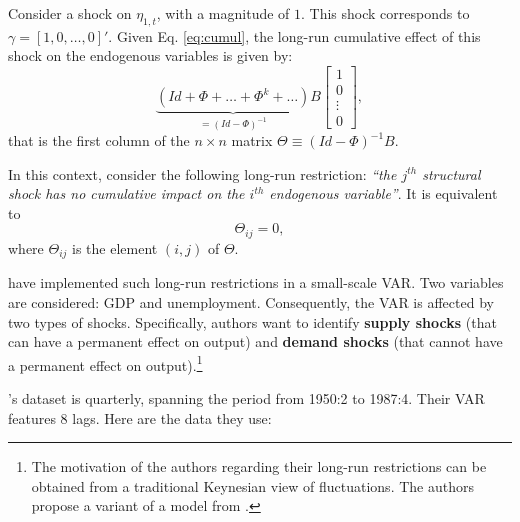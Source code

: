 \documentclass[
  12pt,
]{book}
\newenvironment{Shaded}{\begin{snugshade}}{\end{snugshade}}
\newcommand{\AttributeTok}[1]{\textcolor[rgb]{0.77,0.63,0.00}{#1}}
\newcommand{\DecValTok}[1]{\textcolor[rgb]{0.00,0.00,0.81}{#1}}
\newcommand{\FunctionTok}[1]{\textcolor[rgb]{0.00,0.00,0.00}{#1}}
\newcommand{\NormalTok}[1]{#1}
\newcommand{\SpecialCharTok}[1]{\textcolor[rgb]{0.00,0.00,0.00}{#1}}
\newcommand{\StringTok}[1]{\textcolor[rgb]{0.31,0.60,0.02}{#1}}
\theoremstyle{definition}
\theoremstyle{definition}
\theoremstyle{definition}
\theoremstyle{definition}
\theoremstyle{remark}
\begin{document}
Consider a shock on \(\eta_{1,t}\), with a magnitude of \(1\). This shock corresponds to \(\gamma = [1,0,\dots,0]'\). Given Eq. \eqref{eq:cumul}, the long-run cumulative effect of this shock on the endogenous variables is given by:
\[
\underbrace{(Id+\Phi+\ldots+\Phi^{k}+\ldots)}_{=(Id - \Phi)^{-1}}B\left[\begin{array}{c}
1\\
0\\
\vdots\\
0\end{array}\right],
\]
that is the first column of the \(n \times n\) matrix \(\Theta \equiv (Id - \Phi)^{-1}B\).

In this context, consider the following long-run restriction: \emph{``the \(j^{th}\) structural shock has no cumulative impact on the \(i^{th}\) endogenous variable''}. It is equivalent to
\[
\Theta_{ij}=0,
\]
where \(\Theta_{ij}\) is the element \((i,j)\) of \(\Theta\).

\citet{Blanchard_Quah_1989} have implemented such long-run restrictions in a small-scale VAR. Two variables are considered: GDP and unemployment. Consequently, the VAR is affected by two types of shocks. Specifically, authors want to identify \textbf{supply shocks} (that can have a permanent effect on output) and \textbf{demand shocks} (that cannot have a permanent effect on output).\footnote{The motivation of the authors regarding their long-run restrictions can be obtained from a traditional Keynesian view of fluctuations. The authors propose a variant of a model from \citet{Fischer_1977}.
}

\citet{Blanchard_Quah_1989}'s dataset is quarterly, spanning the period from 1950:2 to 1987:4. Their VAR features 8 lags. Here are the data they use:

\begin{Shaded}
\end{Shaded}
\end{document}
